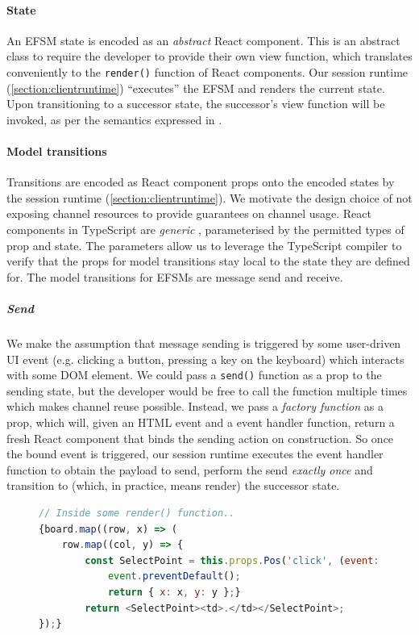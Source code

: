\paragraph{State}
An EFSM state is encoded as an \textit{abstract} React
component.
This is an abstract class to require the developer to provide their
own view function, which translates conveniently to the \texttt{render()}
function of React components.
Our session runtime (\cref{section:clientruntime}) ``executes'' the EFSM and
renders the current state.
Upon transitioning to a successor state, the successor's view function will be
invoked, as per the semantics expressed in \cite{MVU2019}.

\paragraph{Model transitions}
Transitions are encoded as React component props onto the encoded states by the
session runtime (\cref{section:clientruntime}).
We motivate the design choice of not exposing channel resources to provide
guarantees on channel usage.
React components in TypeScript are
\textit{generic} \cite{TypeScriptSpec}, parameterised by the permitted
types of prop and state.
The parameters allow us to leverage the TypeScript compiler to
verify that the props for model transitions stay local to the state they are
defined for.
The model transitions for EFSMs are message send and receive.

\subparagraph{Send}
We make the assumption that message sending is triggered by
some user-driven UI event (e.g. clicking a button, pressing a key on the
keyboard) which interacts with some DOM element.
We could pass a
\texttt{send()} function as a prop to the sending state, but the developer
would be free to call the function multiple times which makes channel reuse
possible.
Instead, we pass a \textit{factory function} as a prop, which will,
given an HTML event and a event handler function, return a fresh React
component that binds the sending action on construction.
So once the bound event is triggered, our session runtime executes the event
handler function to obtain the payload to send, perform the send
\textit{exactly once} and transition to (which, in practice, means render) the
successor state.

\begin{figure}[!h]
\begin{lstlisting}[language=JavaScript, tabsize=4]
// Inside some render() function..
{board.map((row, x) => (
	row.map((col, y) => {
		const SelectPoint = this.props.Pos('click', (event: UIEvent) => {
			event.preventDefault();
			return { x: x, y: y };}
		return <SelectPoint><td>.</td></SelectPoint>;
});}
\end{lstlisting}
\label{lst:clientapp}
\end{figure}

